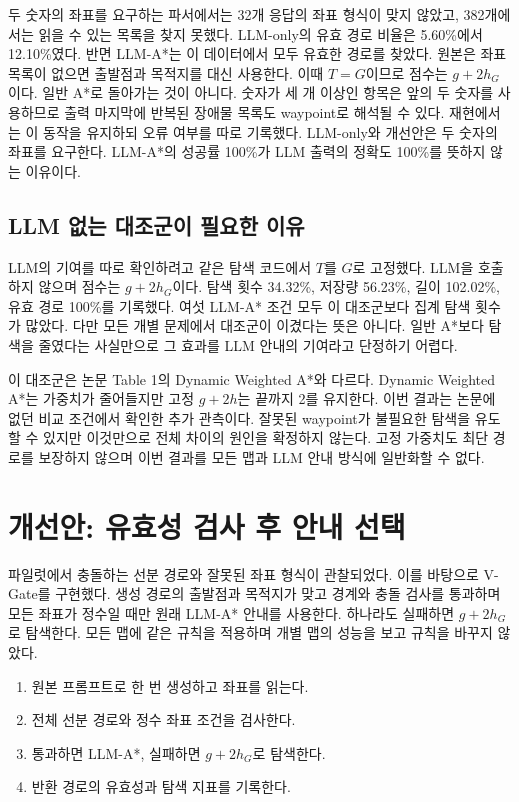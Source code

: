 \documentclass[11pt]{article}
\begin{document}
두 숫자의 좌표를 요구하는 파서에서는 32개 응답의 좌표 형식이 맞지 않았고, 382개에서는 읽을 수 있는 목록을 찾지 못했다. LLM-only의 유효 경로 비율은 5.60\%에서 12.10\%였다. 반면 LLM-A*는 이 데이터에서 모두 유효한 경로를 찾았다. 원본은 좌표 목록이 없으면 출발점과 목적지를 대신 사용한다. 이때 $T=G$이므로 점수는 $g+2h_G$이다. 일반 A*로 돌아가는 것이 아니다. 숫자가 세 개 이상인 항목은 앞의 두 숫자를 사용하므로 출력 마지막에 반복된 장애물 목록도 waypoint로 해석될 수 있다. 재현에서는 이 동작을 유지하되 오류 여부를 따로 기록했다. LLM-only와 개선안은 두 숫자의 좌표를 요구한다. LLM-A*의 성공률 100\%가 LLM 출력의 정확도 100\%를 뜻하지 않는 이유이다.

\subsection{LLM 없는 대조군이 필요한 이유}
LLM의 기여를 따로 확인하려고 같은 탐색 코드에서 $T$를 $G$로 고정했다. LLM을 호출하지 않으며 점수는 $g+2h_G$이다. 탐색 횟수 34.32\%, 저장량 56.23\%, 길이 102.02\%, 유효 경로 100\%를 기록했다. 여섯 LLM-A* 조건 모두 이 대조군보다 집계 탐색 횟수가 많았다. 다만 모든 개별 문제에서 대조군이 이겼다는 뜻은 아니다. 일반 A*보다 탐색을 줄였다는 사실만으로 그 효과를 LLM 안내의 기여라고 단정하기 어렵다.

이 대조군은 논문 Table 1의 Dynamic Weighted A*와 다르다. Dynamic Weighted A*는 가중치가 줄어들지만 고정 $g+2h$는 끝까지 2를 유지한다. 이번 결과는 논문에 없던 비교 조건에서 확인한 추가 관측이다. 잘못된 waypoint가 불필요한 탐색을 유도할 수 있지만 이것만으로 전체 차이의 원인을 확정하지 않는다. 고정 가중치도 최단 경로를 보장하지 않으며 이번 결과를 모든 맵과 LLM 안내 방식에 일반화할 수 없다.

\section{개선안: 유효성 검사 후 안내 선택}
파일럿에서 충돌하는 선분 경로와 잘못된 좌표 형식이 관찰되었다. 이를 바탕으로 V-Gate를 구현했다. 생성 경로의 출발점과 목적지가 맞고 경계와 충돌 검사를 통과하며 모든 좌표가 정수일 때만 원래 LLM-A* 안내를 사용한다. 하나라도 실패하면 $g+2h_G$로 탐색한다. 모든 맵에 같은 규칙을 적용하며 개별 맵의 성능을 보고 규칙을 바꾸지 않았다.

\begin{enumerate}
\item 원본 프롬프트로 한 번 생성하고 좌표를 읽는다.
\item 전체 선분 경로와 정수 좌표 조건을 검사한다.
\item 통과하면 LLM-A*, 실패하면 $g+2h_G$로 탐색한다.
\item 반환 경로의 유효성과 탐색 지표를 기록한다.
\end{enumerate}
\end{document}

